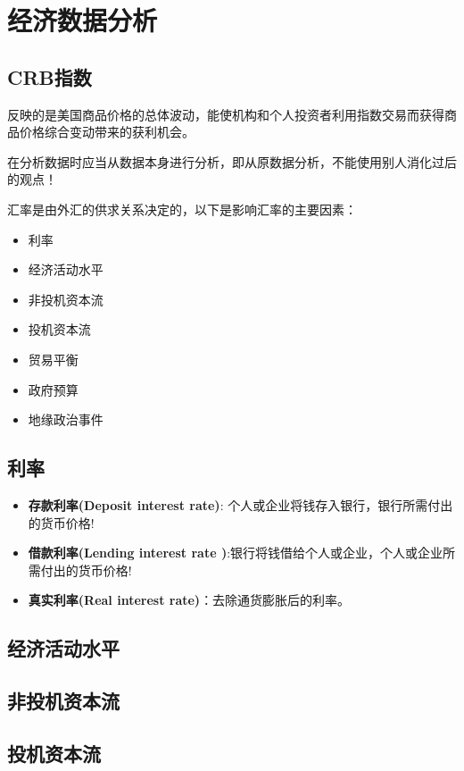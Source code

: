 \chapter{经济数据分析}

\section{CRB指数}

反映的是美国商品价格的总体波动，能使机构和个人投资者利用指数交易而获得商品价格综合变动带来的获利机会。


在分析数据时应当从数据本身进行分析，即从原数据分析，不能使用别人消化过后的观点！

汇率是由外汇的供求关系决定的，以下是影响汇率的主要因素：
\begin{itemize}
\item 利率
\item 经济活动水平
\item 非投机资本流
\item 投机资本流
\item 贸易平衡
\item 政府预算
\item 地缘政治事件
\end{itemize}

\section{利率}

\begin{itemize}
\item \textbf{存款利率(Deposit interest rate)}: 个人或企业将钱存入银行，银行所需付出的货币价格!
\item \textbf{借款利率(Lending interest rate )}:银行将钱借给个人或企业，个人或企业所需付出的货币价格!
\item \textbf{真实利率(Real interest rate)}：去除通货膨胀后的利率。
\end{itemize}

\section{经济活动水平}
\section{非投机资本流}
\section{投机资本流}

